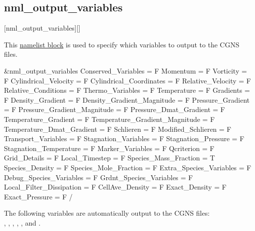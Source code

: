 \subsection{nml\_output\_variables}
\label{SEC:nml_output_variables}
\inp*[nmlOutputVariables]{}[nml\_output\_variables][]

This \hyperref[SEC:User_Input]{namelist block}
is used to specify which variables to output
to the CGNS files.

\begin{nmlblocklst}[
,label={LST:nml_output_variables}
,caption={Namelist nml\_output\_variables.}
]
&nml_output_variables
  Conserved_Variables            = F
  Momentum                       = F
  Vorticity                      = F
  Cylindrical_Velocity           = F
  Cylindrical_Coordinates        = F
  Relative_Velocity              = F
  Relative_Conditions            = F
  Thermo_Variables               = F
  Temperature                    = F
  Gradients                      = F
  Density_Gradient               = F
  Density_Gradient_Magnitude     = F
  Pressure_Gradient              = F
  Pressure_Gradient_Magnitude    = F
  Pressure_Dmat_Gradient         = F
  Temperature_Gradient           = F
  Temperature_Gradient_Magnitude = F
  Temperature_Dmat_Gradient      = F
  Schlieren                      = F
  Modified_Schlieren             = F
  Transport_Variables            = F
  Stagnation_Variables           = F
  Stagnation_Pressure            = F
  Stagnation_Temperature         = F
  Marker_Variables               = F
  Qcriterion                     = F
  Grid_Details                   = F
  Local_Timestep                 = F
  Species_Mass_Fraction          = T
  Species_Density                = F
  Species_Mole_Fraction          = F
  Extra_Species_Variables        = F
  Debug_Species_Variables        = F
  Grdnt_Species_Variables        = F
  Local_Filter_Dissipation       = F
  CellAve_Density                = F
  Exact_Density                  = F
  Exact_Pressure                 = F
/
\end{nmlblocklst}


\FINALFIX{\newpage}
The following variables are automatically output to the CGNS files:
\\
  ,
  ,
  ,
  ,
  , and
  .

